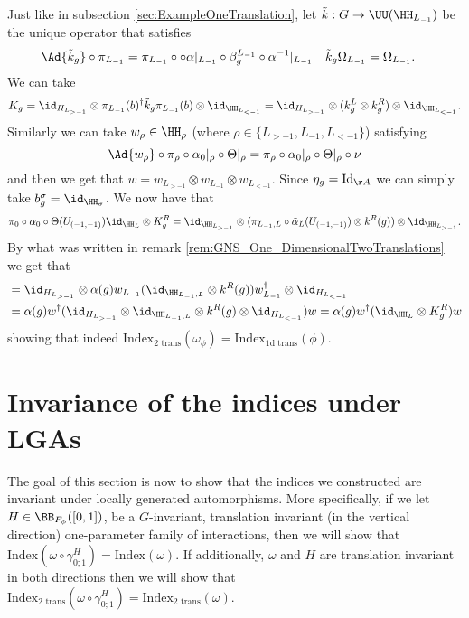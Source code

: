 Just like in subsection \ref{sec:ExampleOneTranslation}, let $\tilde k:G\rightarrow \UU(\HH_{L_{-1}})$ be the unique operator that satisfies
\begin{align}
	\Ad{\tilde{k}_g}\circ\pi_{L_{-1}}&=\pi_{L_{-1}}\circ \circ\alpha|_{L_{-1}}\circ\beta_g^{L_{-1}}\circ \alpha^{-1}|_{L_{-1}}&\tilde k_g\Omega_{L_{-1}}&=\Omega_{L_{-1}}.
\end{align}
We can take
\begin{equation}
	K_g=\id_{H_{L_{>-1}}}\otimes \pi_{L_{-1}}(b)^\dagger \tilde k_g \pi_{L_{-1}}(b) \otimes\id_{\HH_{L_{<-1}}} =\id_{H_{L_{>-1}}}\otimes (k_g^L\otimes k_g^R) \otimes\id_{\HH_{L_{<-1}}}.
\end{equation}
Similarly we can take $w_\rho\in\HH_\rho$ (where $\rho\in\{L_{>-1},L_{-1},L_{<-1}\}$) satisfying
\begin{equation}
	\Ad{w_\rho}\circ\pi_\rho\circ\alpha_{0}|_\rho\circ\Theta|_\rho=\pi_\rho\circ\alpha_{0}|_\rho\circ\Theta|_\rho\circ\nu
\end{equation}
and then we get that $w=w_{L_{>-1}}\otimes w_{L_{-1}}\otimes w_{L_{<-1}}$. Since $\eta_g=\textrm{Id}_{\AA}$ we can simply take $b_g^\sigma=\id_{\HH_\sigma}$. We now have that
\begin{equation}
	\pi_0\circ\alpha_0\circ\Theta(U_{(-1,-1)})\id_{\HH_L}\otimes K_g^R=\id_{\HH_{L_{>-1}}}\otimes(\pi_{L_{-1},L}\circ\tilde\alpha_L(U_{(-1,-1)})\otimes k^R(g))\otimes\id_{\HH_{L_{>-1}}}.
\end{equation}
By what was written in remark \ref{rem:GNS_One_DimensionalTwoTranslations} we get that
\begin{align}
	&=\id_{H_{L_{>-1}}}\otimes\alpha(g) w_{L_{-1}}(\id_{\HH_{L_{-1},L}}\otimes k^R(g))w_{L_{-1}}^\dagger\otimes \id_{H_{L_{<-1}}}\\
	\nonumber
	&=\alpha(g)w^\dagger (\id_{H_{L_{>-1}}}\otimes \id_{\HH_{L_{-1},L}}\otimes k^R(g)\otimes \id_{H_{L_{<-1}}}) w=\alpha(g)w^\dagger (\id_{\HH_L}\otimes K^R_g) w
\end{align}
showing that indeed $\textrm{Index}_{\text{2 trans}}(\omega_\phi)=\textrm{Index}_{\text{1d trans}}(\phi)$.
\section{Invariance of the indices under LGAs}\label{sec:AllIndicesInvariantUnderLGA}
The goal of this section is now to show that the indices we constructed are invariant under locally generated automorphisms. More specifically, if we let $H\in\BB_{F_\phi}([0,1])$, be a $G$-invariant, translation invariant (in the vertical direction) one-parameter family of interactions, then we will show that $\textrm{Index}(\omega\circ\gamma^H_{0;1})=\textrm{Index}(\omega)$. If additionally, $\omega$ and $H$ are translation invariant in both directions then we will show that $\textrm{Index}_{\text{2 trans}}(\omega\circ\gamma^H_{0;1})=\textrm{Index}_{\text{2 trans}}(\omega)$.
